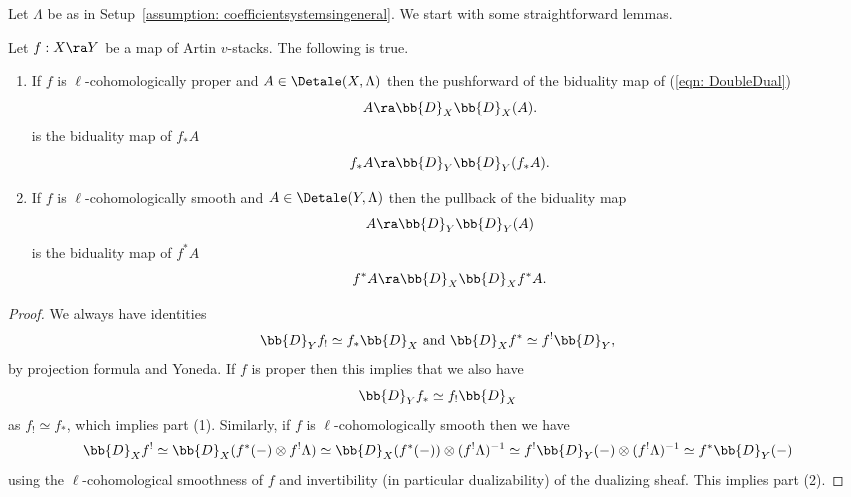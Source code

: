 \documentclass[letterpaper,11pt]{amsart}
\begin{document}
Let $\Lambda$ be as in Setup~\ref{assumption: coefficientsystemsingeneral}. We start with some straightforward lemmas.
\begin{lemma}{\label{lemma: reflexivitystabilityproperties}}
Let $f: X \ra Y$ be a map of Artin $v$-stacks. The following is true. 
\begin{enumerate}
\item If $f$ is $\ell$-cohomologically proper and  $A \in \Detale(X,\Lambda)$ then the pushforward of the biduality map of (\ref{eqn: DoubleDual})
\[ A \ra \bb{D}_{X}\bb{D}_{X}(A). \]
is the biduality map of $f_{*}A$
\[ f_{*}A \ra \bb{D}_{Y}\bb{D}_{Y}(f_{*}A).\]
\item If $f$ is $\ell$-cohomologically smooth and $A \in \Detale(Y,\Lambda)$ then the pullback of the biduality map 
\[ A \ra \bb{D}_{Y}\bb{D}_{Y}(A) \]
is the biduality map of $f^{*}A$
\[ f^{*}A \ra \bb{D}_{X}\bb{D}_{X}f^{*}A.\]
\end{enumerate}
\end{lemma}
\begin{proof}
We always have identities 
\[ \bb{D}_{Y}f_{!} \simeq f_{*}\bb{D}_{X}\ \mathrm{and}\ 
\bb{D}_{X}f^{*} \simeq f^{!}\bb{D}_{Y}, \]
by projection formula and Yoneda. If $f$ is proper then this implies that we also have 
\[ \bb{D}_{Y}f_{*} \simeq f_{!}\bb{D}_{X} \]
as $f_{!} \simeq f_{*}$, which implies part (1). 
Similarly, if $f$ is $\ell$-cohomologically smooth then we have 
\[ \bb{D}_{X}f^{!} \simeq \bb{D}_{X}(f^{*}(-) \otimes f^{!}\Lambda) \simeq \bb{D}_{X}(f^{*}(-))\otimes (f^!\Lambda)^{-1} \simeq f^{!}\bb{D}_{Y}(-)\otimes(f^!\Lambda)^{-1} \simeq f^{*}\bb{D}_{Y}(-) \]
using the $\ell$-cohomological smoothness of $f$ and invertibility (in particular dualizability) of the dualizing sheaf. This implies part (2).
\end{proof}
\end{document}
